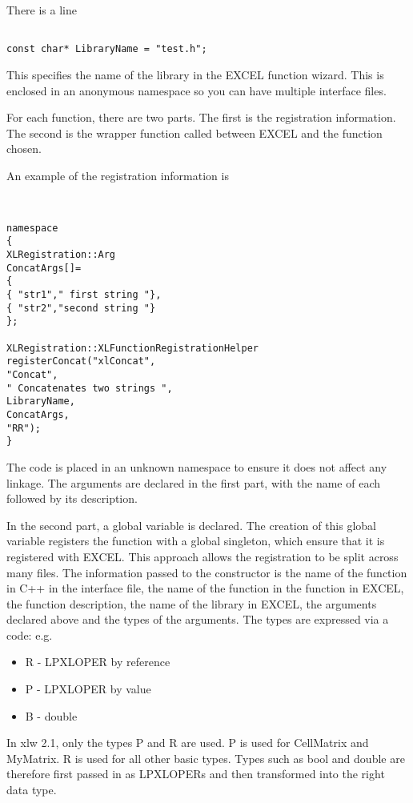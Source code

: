 \documentclass[12pt,reqno]{amsart}
\numberwithin{equation}{section}
\numberwithin{figure}{section}
\begin{document}
There is a line
\begin{verbatim}

const char* LibraryName = "test.h";

\end{verbatim}
This specifies the name of the library in the EXCEL function
wizard. This is enclosed in an anonymous namespace so you can have
multiple interface files. 

For each function, there are two parts. The first is the registration
information. The second is the wrapper function called between EXCEL
and the function chosen. 

An example of the registration information is 
\begin{verbatim}


namespace
{
XLRegistration::Arg
ConcatArgs[]=
{
{ "str1"," first string "},
{ "str2","second string "}
};
  
XLRegistration::XLFunctionRegistrationHelper
registerConcat("xlConcat",
"Concat",
" Concatenates two strings ",
LibraryName,
ConcatArgs,
"RR");
}

\end{verbatim}

The code is placed in an unknown namespace to ensure it does not
affect any linkage. The arguments are declared in the first part, with
the name of each followed by its description. 

In the second part, a global variable is declared. The creation of
this global variable registers the function with a global singleton,
which ensure that it is registered with EXCEL. This approach allows
the registration to be split across many files. The information passed
to the constructor is the name of the function in C++ in the interface
file, the name of the function in the function in EXCEL, the function
description, the name of the library in EXCEL, the arguments declared
above and the types of the arguments. The types are expressed via a
code: e.g. 
\begin{itemize}
\item R - LPXLOPER by reference
\item P - LPXLOPER by value
\item B - double
\end{itemize}

In xlw 2.1, only the types P and R are used. P is used for CellMatrix
and MyMatrix. R is used for all other basic types. Types such as bool and
double are therefore first passed in as LPXLOPERs and then transformed
into the right data type. 
\end{document}
